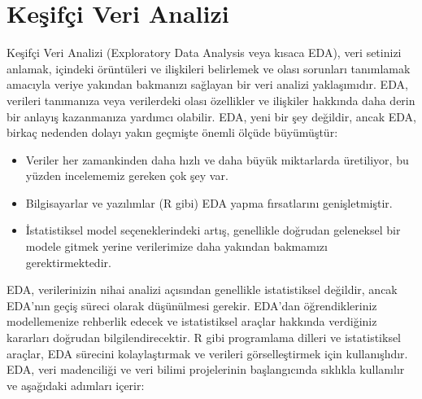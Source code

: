 \documentclass[
  letterpaper,
  DIV=11,
  numbers=noendperiod]{scrreprt}
\begin{document}

\chapter*{Keşifçi Veri Analizi}\label{keux15fifuxe7i-veri-analizi}


Keşifçi Veri Analizi (Exploratory Data Analysis veya kısaca EDA), veri
setinizi anlamak, içindeki örüntüleri ve ilişkileri belirlemek ve olası
sorunları tanımlamak amacıyla veriye yakından bakmanızı sağlayan bir
veri analizi yaklaşımıdır. EDA, verileri tanımanıza veya verilerdeki
olası özellikler ve ilişkiler hakkında daha derin bir anlayış
kazanmanıza yardımcı olabilir. EDA, yeni bir şey değildir, ancak EDA,
birkaç nedenden dolayı yakın geçmişte önemli ölçüde büyümüştür:

\begin{itemize}
\item
  Veriler her zamankinden daha hızlı ve daha büyük miktarlarda
  üretiliyor, bu yüzden incelememiz gereken çok şey var.
\item
  Bilgisayarlar ve yazılımlar (R gibi) EDA yapma fırsatlarını
  genişletmiştir.
\item
  İstatistiksel model seçeneklerindeki artış, genellikle doğrudan
  geleneksel bir modele gitmek yerine verilerimize daha yakından
  bakmamızı gerektirmektedir.
\end{itemize}

EDA, verilerinizin nihai analizi açısından genellikle istatistiksel
değildir, ancak EDA'nın geçiş süreci olarak düşünülmesi gerekir. EDA'dan
öğrendikleriniz modellemenize rehberlik edecek ve istatistiksel araçlar
hakkında verdiğiniz kararları doğrudan bilgilendirecektir. R gibi
programlama dilleri ve istatistiksel araçlar, EDA sürecini
kolaylaştırmak ve verileri görselleştirmek için kullanışlıdır. EDA, veri
madenciliği ve veri bilimi projelerinin başlangıcında sıklıkla
kullanılır ve aşağıdaki adımları içerir:
\end{document}

